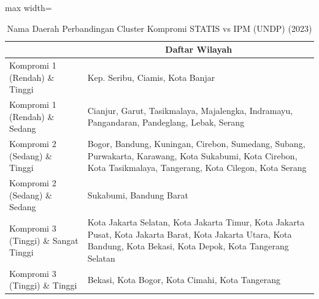 \begin{table}[H]
\centering
\caption{Nama Daerah Perbandingan Cluster Kompromi STATIS vs IPM (UNDP) (2023)} \label{tab:app1comp_ipm_name_2023}
\begin{adjustbox}{max width=\textwidth}
\begin{tabular}{|>{\centering\arraybackslash}p{4cm}|p{10cm}|}
\hline
\multicolumn{1}{|c|}{\textbf{Kategori}} & \multicolumn{1}{c|}{\textbf{Daftar Wilayah}} \\
\hline
Kompromi 1 (Rendah) \& Tinggi & Kep. Seribu, Ciamis, Kota Banjar \\
\hline
Kompromi 1 (Rendah) \& Sedang & Cianjur, Garut, Tasikmalaya, Majalengka, Indramayu, Pangandaran, Pandeglang, Lebak, Serang \\
\hline
Kompromi 2 (Sedang) \& Tinggi & Bogor, Bandung, Kuningan, Cirebon, Sumedang, Subang, Purwakarta, Karawang, Kota Sukabumi, Kota Cirebon, Kota Tasikmalaya, Tangerang, Kota Cilegon, Kota Serang \\
\hline
Kompromi 2 (Sedang) \& Sedang & Sukabumi, Bandung Barat \\
\hline
Kompromi 3 (Tinggi) \& Sangat Tinggi & Kota Jakarta Selatan, Kota Jakarta Timur, Kota Jakarta Pusat, Kota Jakarta Barat, Kota Jakarta Utara, Kota Bandung, Kota Bekasi, Kota Depok, Kota Tangerang Selatan \\
\hline
Kompromi 3 (Tinggi) \& Tinggi & Bekasi, Kota Bogor, Kota Cimahi, Kota Tangerang \\
\hline
\end{tabular}
\end{adjustbox}
\end{table}